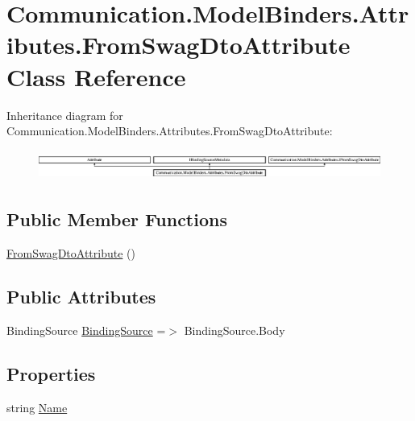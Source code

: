 \hypertarget{class_communication_1_1_model_binders_1_1_attributes_1_1_from_swag_dto_attribute}{}\section{Communication.\+Model\+Binders.\+Attributes.\+From\+Swag\+Dto\+Attribute Class Reference}
\label{class_communication_1_1_model_binders_1_1_attributes_1_1_from_swag_dto_attribute}
Inheritance diagram for Communication.\+Model\+Binders.\+Attributes.\+From\+Swag\+Dto\+Attribute\+:\begin{figure}[H]
\begin{center}
\leavevmode
\includegraphics[height=0.990274cm]{class_communication_1_1_model_binders_1_1_attributes_1_1_from_swag_dto_attribute}
\end{center}
\end{figure}
\subsection*{Public Member Functions}
\begin{DoxyCompactItemize}
\item 
\mbox{\hyperlink{class_communication_1_1_model_binders_1_1_attributes_1_1_from_swag_dto_attribute_ae55646bd4c01a2386c3de4b8f80d40e4}{From\+Swag\+Dto\+Attribute}} ()
\end{DoxyCompactItemize}
\subsection*{Public Attributes}
\begin{DoxyCompactItemize}
\item 
Binding\+Source \mbox{\hyperlink{class_communication_1_1_model_binders_1_1_attributes_1_1_from_swag_dto_attribute_ac5a2369f6f9b0bc410d3da81832540d2}{Binding\+Source}} =$>$ Binding\+Source.\+Body
\end{DoxyCompactItemize}
\subsection*{Properties}
\begin{DoxyCompactItemize}
\item 
string \mbox{\hyperlink{class_communication_1_1_model_binders_1_1_attributes_1_1_from_swag_dto_attribute_a3f792d692d2ba7376a1b971127a8c793}{Name}}
\end{DoxyCompactItemize}


